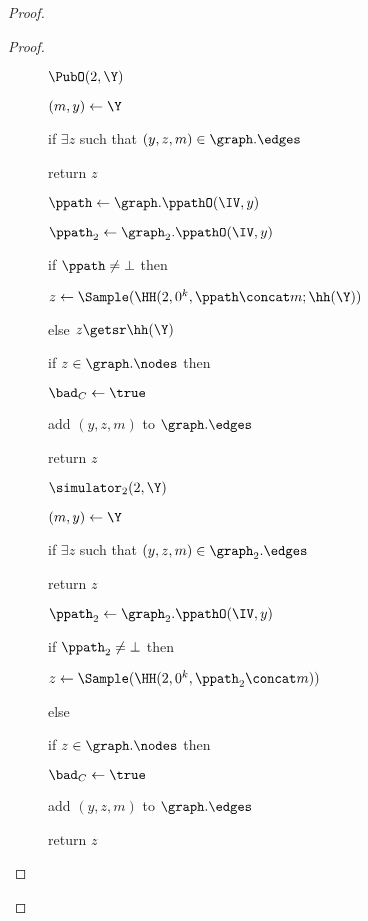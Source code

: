 \begin{proof}
\begin{proof}
\begin{figure}
{				\ExptSepSpace
				\begin{algorithm}{$\PubO(2,\Y)$}
					\item $(m, y) \gets \Y$
					\item if $\exists z$ such that $(y, z, m) \in \graph.\edges$
					\item \quad return $z$
					\item $\ppath \gets \graph.\ppathO(\IV, y)$
					\item $\ppath_2 \gets \graph_2.\ppathO(\IV, y)$
					\item if $\ppath \neq \bot$ then 
					\item \quad $z \gets \Sample(\HH(2, 0^k, \ppath\concat m; \hh(\Y))$
					\item {}
					\item \quad {}
					\item \quad {}
					\item else  $z \getsr \hh(\Y)$
					\item if $z \in \graph.\nodes$ then
					\item $\bad_C \gets \true$
					\item add $(y, z, m)$ to $\graph.\edges$
					\item {}
					\item return $z$
				\end{algorithm}
				}
		{
			\ExptSepSpace
			\begin{algorithm}{$\simulator_2(2,\Y)$}
				\item $(m, y) \gets \Y$
				\item if $\exists z$ such that $(y, z, m) \in \graph_2.\edges$
				\item \quad return $z$
			\item $\ppath_2 \gets \graph_2.\ppathO(\IV, y)$
				\item if $\ppath_2 \neq \bot$ then 
				\item \quad $z \gets \Sample(\HH(2, 0^k, \ppath_2\concat m))$
				\item else 
				\item if $z \in \graph.\nodes$ then
				\item $\bad_C \gets \true$
				\item add $(y, z, m)$ to $\graph.\edges$
				\item {}
				\item return $z$

\end{algorithm}}
\end{figure}
\end{proof}
\end{proof}
